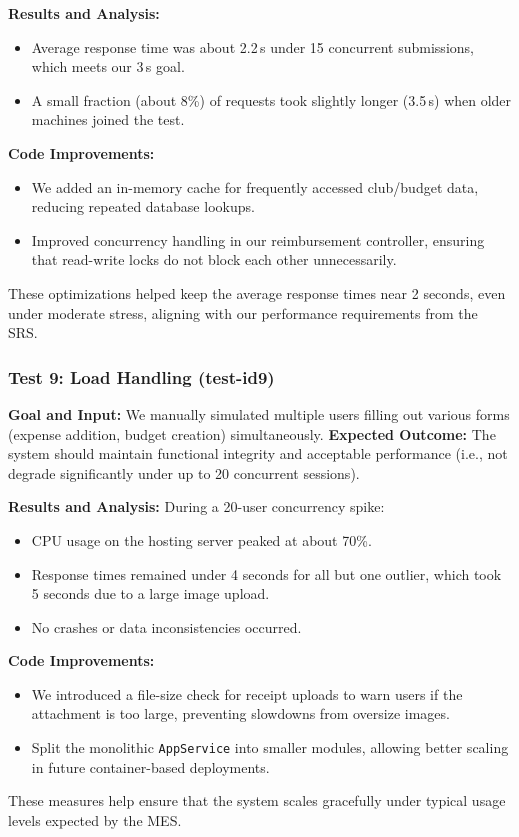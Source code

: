 \documentclass[12pt, titlepage]{article}
\begin{document}
\noindent
\textbf{Results and Analysis:}  
\begin{itemize}
  \item Average response time was about 2.2\,s under 15 concurrent submissions, which meets our 3\,s goal.
  \item A small fraction (about 8\%) of requests took slightly longer (3.5\,s) when older machines joined the test.
\end{itemize}

\noindent
\textbf{Code Improvements:}  
\begin{itemize}
  \item We added an in-memory cache for frequently accessed club/budget data, reducing repeated database lookups.
  \item Improved concurrency handling in our reimbursement controller, ensuring that read-write locks do not block each other unnecessarily.
\end{itemize}
These optimizations helped keep the average response times near 2 seconds, even under moderate stress, aligning with our performance requirements from the SRS.

\subsubsection{Test 9: Load Handling (test-id9)}

\noindent
\textbf{Goal and Input:}  
We manually simulated multiple users filling out various forms (expense addition, budget creation) simultaneously.  
\textbf{Expected Outcome:} The system should maintain functional integrity and acceptable performance (i.e., not degrade significantly under up to 20 concurrent sessions).

\noindent
\textbf{Results and Analysis:}  
During a 20-user concurrency spike:
\begin{itemize}
  \item CPU usage on the hosting server peaked at about 70\%.  
  \item Response times remained under 4 seconds for all but one outlier, which took 5 seconds due to a large image upload.
  \item No crashes or data inconsistencies occurred.
\end{itemize}

\noindent
\textbf{Code Improvements:}
\begin{itemize}
  \item We introduced a file-size check for receipt uploads to warn users if the attachment is too large, preventing slowdowns from oversize images.
  \item Split the monolithic \texttt{AppService} into smaller modules, allowing better scaling in future container-based deployments.
\end{itemize}
These measures help ensure that the system scales gracefully under typical usage levels expected by the MES.
\end{document}
